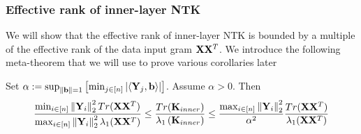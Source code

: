 \subsubsection{Effective rank of inner-layer NTK}\label{sec:eff_rank_inner}
We will show that the effective rank of inner-layer NTK is bounded by a multiple of the effective rank of the data input gram $\mathbf{X} \mathbf{X}^T$.  We introduce the following meta-theorem that we will use to prove various corollaries later
\begin{theorem}\label{thm:inner_meta}
Set $\alpha := \sup_{\left\lVert\mathbf b\right\rVert = 1} \left[\min_{j \in [n]} |\langle \mathbf{Y}_j, \mathbf b \rangle|\right]$.  Assume $\alpha > 0$.  Then
\[\frac{\min_{i \in [n]} \left\lVert\mathbf{Y}_i\right\rVert_2^2 Tr(\mathbf{X} \mathbf{X}^T)}{\max_{i \in [n]} \left\lVert\mathbf{Y}_i\right\rVert_2^2 \lambda_1(\mathbf{X} \mathbf{X}^T)} \leq \frac{Tr(\mathbf{K}_{inner})}{\lambda_1 \left(\mathbf{K}_{inner}\right)} \leq \frac{\max_{i \in [n]} \left\lVert\mathbf{Y}_i\right\rVert_2^2}{\alpha^2} \frac{Tr(\mathbf{X} \mathbf{X}^T)}{\lambda_1(\mathbf{X} \mathbf{X}^T)} \]
\end{theorem}
